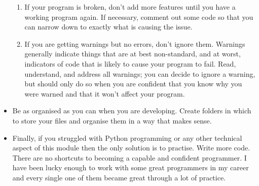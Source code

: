 \documentclass[letterpaper,11pt]{texMemo}
\begin{document}
\begin{itemize}
\begin{enumerate}
\item If your program is broken, don’t add more features until you have a working program again. If necessary, comment out some code so that you can narrow down to exactly what is causing the issue.

\item If you are getting warnings but no errors, don’t ignore them. Warnings generally indicate things that are at best non-standard, and at worst, indicators of code that is likely to cause your program to fail. Read, understand, and address all warnings; you can decide to ignore a warning, but should only do so when you are confident that you know why you were warned and that it won’t affect your program.

\end{enumerate}


\item Be as organised as you can when you are developing. Create folders in which to store your files and organise them in a way that makes sense.
\item Finally, if you struggled with Python programming or any other technical aspect of this module then the only solution is to practise. Write more code. There are no shortcuts to becoming a capable and confident programmer. I have been lucky enough to work with some great programmers in my career and every single one of them became great through a lot of practice.
\end{itemize}
\end{document}
